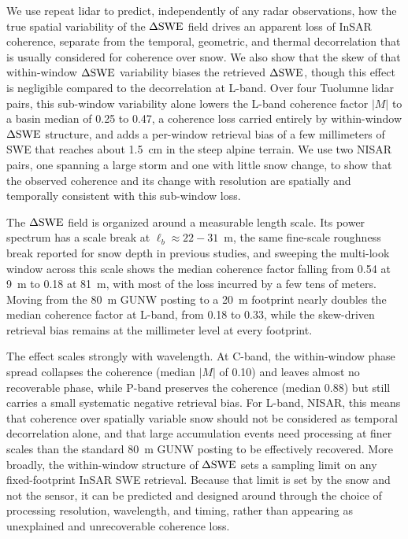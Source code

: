 \documentclass[journal abbreviation, manuscript]{copernicus}
\begin{document}
\conclusions  %
We use repeat lidar to predict, independently of any radar observations, how the true spatial variability of the $\Delta\mathrm{SWE}$ field drives an apparent loss of InSAR coherence, separate from the temporal, geometric, and thermal decorrelation that is usually considered for coherence over snow. We also show that the skew of that within-window $\Delta\mathrm{SWE}$ variability biases the retrieved $\Delta\mathrm{SWE}$, though this effect is negligible compared to the decorrelation at L-band. Over four Tuolumne lidar pairs, this sub-window variability alone lowers the L-band coherence factor $|M|$ to a basin median of 0.25 to 0.47, a coherence loss carried entirely by within-window $\Delta\mathrm{SWE}$ structure, and adds a per-window retrieval bias of a few millimeters of SWE that reaches about 1.5~cm in the steep alpine terrain. We use two NISAR pairs, one spanning a large storm and one with little snow change, to show that the observed coherence and its change with resolution are spatially and temporally consistent with this sub-window loss.

The $\Delta\mathrm{SWE}$ field is organized around a measurable length scale. Its power spectrum has a scale break at $\ell_b \approx 22-31$~m, the same fine-scale roughness break reported for snow depth in previous studies, and sweeping the multi-look window across this scale shows the median coherence factor falling from 0.54 at 9~m to 0.18 at 81~m, with most of the loss incurred by a few tens of meters. Moving from the 80~m GUNW posting to a 20~m footprint nearly doubles the median coherence factor at L-band, from 0.18 to 0.33, while the skew-driven retrieval bias remains at the millimeter level at every footprint.

The effect scales strongly with wavelength. At C-band, the within-window phase spread collapses the coherence (median $|M|$ of 0.10) and leaves almost no recoverable phase, while P-band preserves the coherence (median 0.88) but still carries a small systematic negative retrieval bias. For L-band, NISAR, this means that coherence over spatially variable snow should not be considered as temporal decorrelation alone, and that large accumulation events need processing at finer scales than the standard 80~m GUNW posting to be effectively recovered. More broadly, the within-window structure of $\Delta\mathrm{SWE}$ sets a sampling limit on any fixed-footprint InSAR SWE retrieval. Because that limit is set by the snow and not the sensor, it can be predicted and designed around through the choice of processing resolution, wavelength, and timing, rather than appearing as unexplained and unrecoverable coherence loss.
\end{document}
